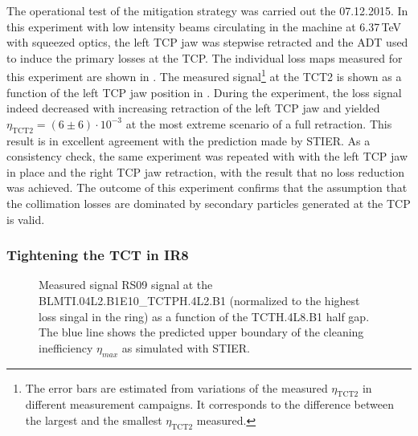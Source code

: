 The operational test of the mitigation strategy was carried out the 07.12.2015. In this experiment with low intensity beams circulating in the machine at 6.37\,TeV with squeezed optics, the left TCP jaw was stepwise retracted and the ADT used to induce the primary losses at the TCP. The individual loss maps measured for this experiment are shown in . The measured signal\footnote{The error bars are estimated from variations of the measured $\eta_\text{TCT2}$ in different measurement campaigns. It corresponds to the difference between the largest and the smallest $\eta_\text{TCT2}$ measured.} at the TCT2 is shown as a function of the left TCP jaw position in . During the experiment, the loss signal indeed decreased with increasing retraction of the left TCP jaw and yielded $\eta_\text{TCT2}=(6 \pm 6 )\cdot 10^{-3}$ at the most extreme scenario of a full retraction. This result is in excellent agreement with the prediction made by STIER. As a consistency check, the same experiment was repeated with with the left TCP jaw in place and the right TCP jaw retraction, with the result that no loss reduction was achieved. The outcome of this experiment confirms that the assumption that the collimation losses are dominated by secondary particles generated at the TCP is valid. 

\subsubsection{Tightening the TCT in IR8}

\begin{figure}[t]
  \centering
  \caption{Measured signal RS09 signal at the BLMTI.04L2.B1E10\_TCTPH.4L2.B1 (normalized to the highest loss singal in the ring) as a function of the TCTH.4L8.B1 half gap. The blue line shows the predicted upper boundary of the cleaning inefficiency $\eta_{max}$ as simulated with STIER. }  
  \label{pic:16062101}
  \end{figure}

